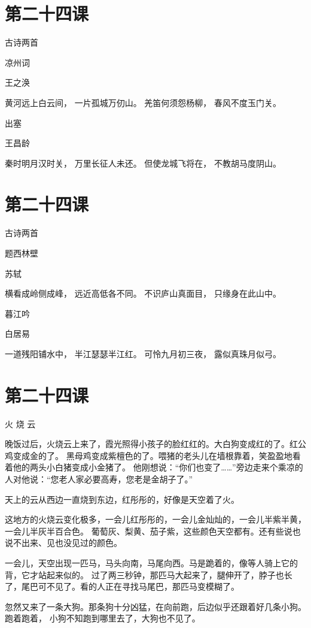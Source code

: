 \documentclass[12pt,UTF8]{ctexbook}
\begin{document}
\section{第二十四课}

古诗两首

凉州词 

王之涣

黄河远上白云间，
一片孤城万仞山。
羌笛何须怨杨柳，
春风不度玉门关。

出塞

王昌龄

秦时明月汉时关，
万里长征人未还。
但使龙城飞将在，
不教胡马度阴山。

\section{第二十四课}

古诗两首

题西林壁 

苏轼

横看成岭侧成峰，
远近高低各不同。
不识庐山真面目，
只缘身在此山中。

暮江吟

白居易

一道残阳铺水中，
半江瑟瑟半江红。
可怜九月初三夜，
露似真珠月似弓。

\section{第二十四课}

火 烧 云

晚饭过后，火烧云上来了，霞光照得小孩子的脸红红的。大白狗变成红的了。红公鸡变成金的了。
黑母鸡变成紫檀色的了。喂猪的老头儿在墙根靠着，笑盈盈地看着他的两头小白猪变成小金猪了。
他刚想说：“你们也变了……”旁边走来个乘凉的人对他说：“您老人家必要高寿，您老是金胡子了。”

天上的云从西边一直烧到东边，红彤彤的，好像是天空着了火。

这地方的火烧云变化极多，一会儿红彤彤的，一会儿金灿灿的，一会儿半紫半黄，一会儿半灰半百合色。
葡萄灰、梨黄、茄子紫，这些颜色天空都有。还有些说也说不出来、见也没见过的颜色。

一会儿，天空出现一匹马，马头向南，马尾向西。马是跪着的，像等人骑上它的背，它才站起来似的。
过了两三秒钟，那匹马大起来了，腿伸开了，脖子也长了，尾巴可不见了。看的人正在寻找马尾巴，那匹马变模糊了。

忽然又来了一条大狗。那条狗十分凶猛，在向前跑，后边似乎还跟着好几条小狗。跑着跑着，
小狗不知跑到哪里去了，大狗也不见了。
\end{document}
